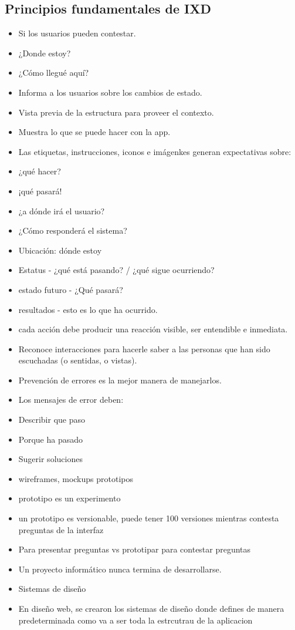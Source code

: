 \documentclass{article}
\begin{document}
\subsection{Principios fundamentales de IXD}
\begin{itemize}
    \item Si los usuarios pueden contestar.
    \item ¿Donde estoy?
    \item ¿Cómo llegué aquí?
    \item Informa a los usuarios sobre los cambios de estado.
    \item Vista previa de la estructura para proveer el contexto. 
    \item Muestra lo que se puede hacer con la app.
    \item Las etiquetas, instrucciones, iconos e imágenkes generan expectativas sobre:
    \item ¿qué hacer?
    \item ¡qué pasará!
    \item ¿a dónde irá el usuario?
    \item ¿Cómo responderá el sistema?
    \item Ubicación: dónde estoy
    \item Estatus - ¿qué está pasando? / ¿qué sigue ocurriendo?
    \item estado futuro - ¿Qué pasará?
    \item resultados - esto es lo que ha ocurrido.
    \item cada acción debe producir una reacción visible, ser entendible e inmediata.
    \item Reconoce interacciones para hacerle saber a las personas que han sido escuchadas (o sentidas, o vistas).
    \item Prevención de errores es la mejor manera de manejarlos.
    \item Los mensajes de error deben:
    \item Describir que paso 
    \item Porque ha pasado
    \item Sugerir soluciones
    \item wireframes, mockups prototipos
    \item prototipo es un experimento
    \item un prototipo es versionable, puede tener 100 versiones mientras contesta preguntas de la interfaz
    \item Para presentar preguntas vs prototipar para contestar preguntas
    \item Un proyecto informático nunca termina de desarrollarse.
    \item Sistemas de diseño
    \item En diseño web, se crearon los sistemas de diseño donde defines de manera predeterminada como va a ser toda la estrcutrau de la aplicacion
    
\end{itemize}
\end{document}
